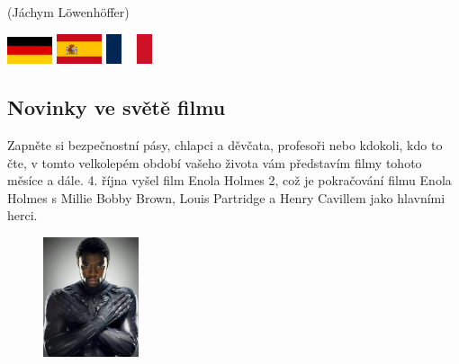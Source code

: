 \documentclass[12pt, a4paper]{article}
\begin{document}
\begin{multicols*}{2}
		\par \begin{flushright}
			 \footnotesize (Jáchym Löwenhöffer)
		\end{flushright}
		\begin{multicols}{3}
			\begin{center}
				\includegraphics[width=0.1\textwidth]{G}
				\includegraphics[width=0.1\textwidth]{S}
				\includegraphics[width=0.1\textwidth]{FR}
			\end{center}
		\end{multicols}

		\begin{center}\section*{Novinky ve světě filmu} \end{center}
		Zapněte si bezpečnostní pásy, chlapci a děvčata, profesoři nebo kdokoli, kdo to čte, v tomto velkolepém období vašeho života vám představím filmy tohoto měsíce a dále. 4. října vyšel film Enola Holmes 2, což je pokračování filmu Enola Holmes s Millie Bobby Brown, Louis Partridge a Henry Cavillem jako hlavními herci. \par

		\begin{figure}
			\begin{flushright}
				\vspace{-2\baselineskip}
				
				\includegraphics[width=0.25\textwidth]{1}
				\vspace{-2\baselineskip}
			\end{flushright}
			

\end{figure}
\end{multicols*}
\end{document}
